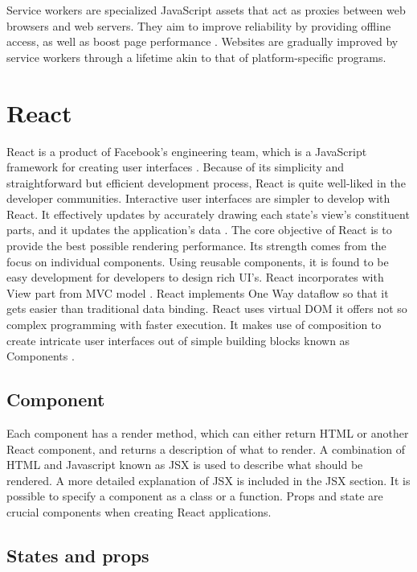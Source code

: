 Service workers are specialized JavaScript assets that act as proxies between web browsers and web servers. They aim to improve reliability by providing offline access, as well as boost page performance \autocite{chrome2021service}. Websites are gradually improved by service workers through a lifetime akin to that of platform-specific programs.


\section{React}

React is a product of Facebook's engineering team, which is a JavaScript framework for creating user interfaces \autocite{gackenheimer2015introducing}. Because of its simplicity and straightforward but efficient development process, React is quite well-liked in the developer communities. Interactive user interfaces are simpler to develop with React. It effectively updates by accurately drawing each state's view's constituent parts, and it updates the application's data \autocite{islam2017reactjs}. The core objective of React is to provide the best possible rendering performance. Its strength comes from the focus on individual components. Using reusable components, it is found to be easy development for developers to design rich UI's. React incorporates with View part from MVC model \autocite{maratkar2021re}. React implements One Way dataflow so that it gets easier than traditional data binding. React uses virtual DOM it offers not so complex programming with faster execution. It makes use of composition to create intricate user interfaces out of simple building blocks known as Components \autocite{david2020building}.

\subsection{Component}

Each component has a render method, which can either return HTML or another React component, and returns a description of what to render. A combination of HTML and Javascript known as JSX is used to describe what should be rendered. A more detailed explanation of JSX is included in the JSX section. It is possible to specify a component as a class or a function. Props and state are crucial components when creating React applications.

\subsection{States and props}

